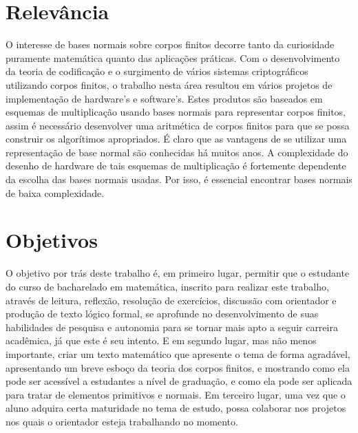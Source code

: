 \documentclass[12pt,twoside]{article}
\begin{document}
  \section{Relevância}
    O interesse de bases normais sobre corpos finitos decorre tanto da
    curiosidade puramente matemática quanto das aplicações práticas. Com o
    desenvolvimento da teoria de codificação e o surgimento de vários sistemas
    criptográficos utilizando corpos finitos, o trabalho nesta área resultou em vários
    projetos de implementação de hardware's e software's. Estes produtos são
    baseados em esquemas de multiplicação usando bases normais para representar
    corpos finitos, assim é necessário desenvolver uma aritmética de corpos finitos para
    que se possa construir os algorítimos apropriados. É claro que as vantagens de se
    utilizar uma representação de base normal são conhecidas há muitos anos. A
    complexidade do desenho de hardware de tais esquemas de multiplicação é
    fortemente dependente da escolha das bases normais usadas. Por isso, é essencial
    encontrar bases normais de baixa complexidade. \\
    

  \section{Objetivos}
    O objetivo por trás deste trabalho é, em primeiro lugar, permitir que o estudante do curso de
    bacharelado em matemática, inscrito para realizar este trabalho, através de leitura, reflexão, resolução
    de exercícios, discussão com orientador e produção de texto lógico formal, se aprofunde no
    desenvolvimento de suas habilidades de pesquisa e autonomia para se tornar mais apto a seguir
    carreira acadêmica, já que este é seu intento. E em segundo lugar, mas não menos importante, criar
    um texto matemático que apresente o tema de forma agradável, apresentando um breve esboço da
    teoria dos corpos finitos, e mostrando como ela pode ser acessível a estudantes a nível de graduação,
    e como ela pode ser aplicada para tratar de elementos primitivos e normais. Em terceiro lugar, uma
    vez que o aluno adquira certa maturidade no tema de estudo, possa colaborar nos projetos nos quais
    o orientador esteja trabalhando no momento.\\
    
\end{document}
